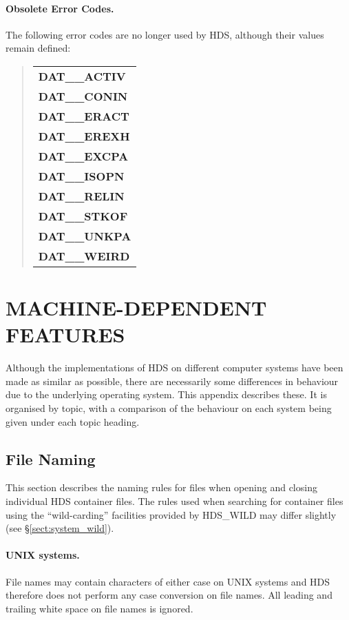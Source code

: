 \paragraph{Obsolete Error Codes.}
The following error codes are no longer used by HDS, although their values
remain defined:

\begin{quote}
\begin{center}
\begin{tabular}{l}
{\bf DAT\_\_ACTIV}\\
{\bf DAT\_\_CONIN}\\
{\bf DAT\_\_ERACT}\\
{\bf DAT\_\_EREXH}\\
{\bf DAT\_\_EXCPA}\\
{\bf DAT\_\_ISOPN}\\
{\bf DAT\_\_RELIN}\\
{\bf DAT\_\_STKOF}\\
{\bf DAT\_\_UNKPA}\\
{\bf DAT\_\_WEIRD}
\end{tabular}
\end{center}
\end{quote}

\newpage
\section{MACHINE-DEPENDENT FEATURES}

Although the implementations of HDS on different computer systems have been
made as similar as possible, there are necessarily some differences in
behaviour due to the underlying operating system. This appendix describes
these. It is organised by topic, with a comparison of the behaviour on each
system being given under each topic heading.

\subsection{File Naming}
\label{sect:system_files}

This section describes the naming rules for files when opening and closing
individual HDS container files. The rules used when searching for container
files using the ``wild-carding'' facilities provided by HDS\_WILD may differ
slightly (see \S\ref{sect:system_wild}).

\paragraph{UNIX systems.} File names may contain characters of either case on
UNIX systems and HDS therefore does not perform any case conversion on file
names. All leading and trailing white space on file names is ignored.

